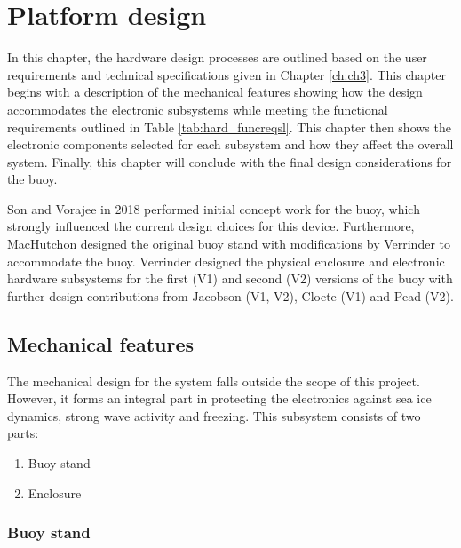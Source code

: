 
\chapter{Platform design}
\label{ch:ch4}

In this chapter, the hardware design processes are outlined based on the user requirements and technical specifications given in Chapter \ref{ch:ch3}. This chapter begins with a description of the mechanical features showing how the design accommodates the electronic subsystems while meeting the functional requirements outlined in Table \ref{tab:hard_funcreqsl}. This chapter then shows the electronic components selected for each subsystem and how they affect the overall system. Finally, this chapter will conclude with the final design considerations for the buoy. \par 

Son and Vorajee in 2018 performed initial concept work for the buoy, which strongly influenced the current design choices for this device. Furthermore, MacHutchon designed the original buoy stand with modifications by Verrinder to accommodate the buoy. Verrinder designed the physical enclosure and electronic hardware subsystems for the first (V1) and second (V2) versions of the buoy with further design contributions from Jacobson (V1, V2), Cloete (V1) and Pead (V2).
\section{Mechanical features}

The mechanical design for the system falls outside the scope of this project. However, it forms an integral part in protecting the electronics against sea ice dynamics, strong wave activity and freezing. This subsystem consists of two parts: 

\begin{enumerate}
	\item Buoy stand
	\item Enclosure
\end{enumerate}


\subsection{Buoy stand}

